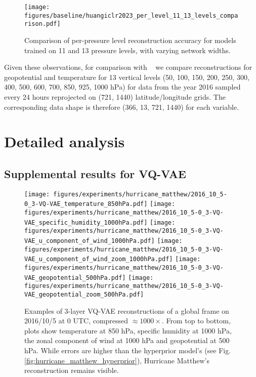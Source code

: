 \documentclass[11pt, a4paper, logo, copyright, numbering]{googledeepmind}
\begin{document}
\begin{figure}[h]
\centering
\texttt{[image: figures/baseline/huangiclr2023\_per\_level\_11\_13\_levels\_comparison.pdf]}
\caption{Comparison of per-pressure level reconstruction accuracy for models trained on 11 and 13 pressure levels, with varying network widths.}
\label{fig:huangiclr2023_per_level_11_13_levels_comparison}
\end{figure}

Given these observations, for comparison with ~\cite{huang2022compressing} we compare reconstructions for geopotential and temperature for 13 vertical levels  (50, 100, 150, 200, 250, 300, 400, 500, 600, 700, 850, 925, 1000 hPa) for data from the year 2016 sampled every 24 hours reprojected on (721, 1440) latitude/longitude grids. The corresponding data shape is therefore (366, 13, 721, 1440) for each variable. 
\section{Detailed analysis}
\label{sx:appendix:analysis}
\subsection{Supplemental results for VQ-VAE}

\begin{figure}
    \centering
    \texttt{[image: figures/experiments/hurricane\_matthew/2016\_10\_5-0\_3-VQ-VAE\_temperature\_850hPa.pdf]}
    \texttt{[image: figures/experiments/hurricane\_matthew/2016\_10\_5-0\_3-VQ-VAE\_specific\_humidity\_1000hPa.pdf]}
    \texttt{[image: figures/experiments/hurricane\_matthew/2016\_10\_5-0\_3-VQ-VAE\_u\_component\_of\_wind\_1000hPa.pdf]}
    \texttt{[image: figures/experiments/hurricane\_matthew/2016\_10\_5-0\_3-VQ-VAE\_u\_component\_of\_wind\_zoom\_1000hPa.pdf]}
    \texttt{[image: figures/experiments/hurricane\_matthew/2016\_10\_5-0\_3-VQ-VAE\_geopotential\_500hPa.pdf]}
    \texttt{[image: figures/experiments/hurricane\_matthew/2016\_10\_5-0\_3-VQ-VAE\_geopotential\_zoom\_500hPa.pdf]}
    \hfill
    \caption{Examples of 3-layer VQ-VAE reconstructions of a global frame on 2016/10/5 at 0 UTC, compressed $\approx 1000\times$. From top to bottom, plots show temperature at 850 hPa, specific humidity at 1000 hPa, the zonal component of wind at 1000 hPa and geopotential at 500 hPa. While errors are higher than the hyperprior model's (see Fig. \ref{fig:hurricane_matthew_hyperprior}), Hurricane Matthew's reconstruction remains visible.}
    \label{fig:hurricane_matthew_vqvae}
\end{figure}
\end{document}
